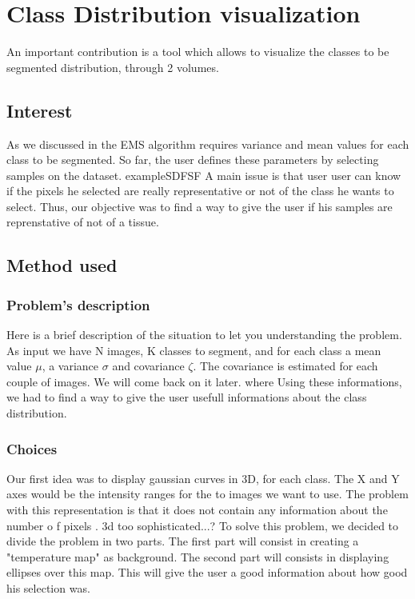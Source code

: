 \section{Class Distribution visualization}\label{sec:tables}
An important contribution is a tool which allows to visualize the classes to be segmented distribution, through 2 volumes.
\subsection{Interest}
As we discussed in 
the EMS algorithm requires variance and mean values for each class to be segmented. So far, the user defines these parameters by selecting samples on the dataset.
%
exampleSDFSF
%
A main issue is that user user can know if the pixels he selected are really representative or not of the class he wants to select. Thus, our objective  was to find a way to give the user if his samples are reprenstative of not of a tissue.
\subsection{Method used}
\subsubsection{Problem's description}
Here is a brief description of the situation to let you understanding the problem. As input we have N images, K classes to segment, and for each class a mean value $\mu$, a variance $\sigma$ and covariance $\zeta$. The covariance is estimated for each couple of images. We will come back on it later.
%
where
%
Using these informations, we had to find a way to give the user usefull informations about the class distribution.
\subsubsection{Choices}
Our first idea was to display gaussian curves in 3D, for each class. The X and Y axes would be the intensity ranges for the to images we want to use.
The problem with this representation is that it does not contain any information about the number o
%
f pixels .  3d too sophisticated...?
%
To solve this problem, we decided to divide the problem in two parts.
The first part will consist in creating a "temperature map" as background.
The second part will consists in displaying ellipses over this map. This will give the user a good information about how good his selection was.
